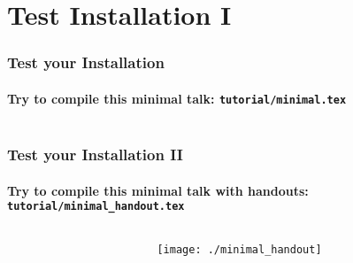 \section{Test Installation I}
\begin{frame}[fragile,label=examples]
        \frametitle{Test your Installation}
        \framesubtitle{Try to compile this minimal talk: {\tt tutorial/minimal.tex}}
        \begin{columns}
        \begin{column}[T]{0.4\textwidth}
        \footnotesize
        
        \end{column}\hfill
        \begin{column}[T]{0.4\textwidth}
        \setlength{\fboxsep}{0pt}%
        \end{column}
        \end{columns}
\end{frame}

\begin{frame}[fragile]
        \frametitle{Test your Installation II}
        \framesubtitle{Try to compile this minimal talk with handouts: {\tt tutorial/minimal\_handout.tex}}
        \begin{columns}
        \begin{column}[T]{0.4\textwidth}
        \scriptsize
        
        \end{column}
        \begin{column}[T]{0.4\textwidth}
        \texttt{[image: ./minimal\_handout]}
        \end{column}
        \end{columns}
\end{frame}
